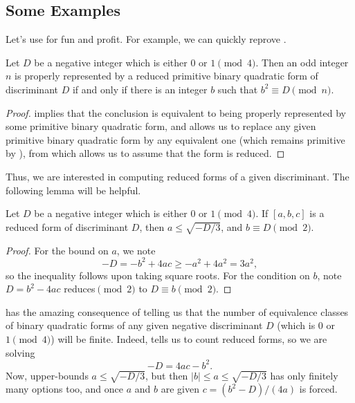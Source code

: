 \documentclass[../notes.tex]{subfiles}
\begin{document}
\subsection{Some Examples} \label{subsec:compute-primes-of-form}
Let's use  for fun and profit. For example, we can quickly reprove .
\begin{lemma} \label{lem:of-the-form-reduced}
	Let $D$ be a negative integer which is either $0$ or $1\pmod4$. Then an odd integer $n$ is properly represented by a reduced primitive binary quadratic form of discriminant $D$ if and only if there is an integer $b$ such that $b^2\equiv D\pmod n$.
\end{lemma}
\begin{proof}
	 implies that the conclusion is equivalent to being properly represented by some primitive binary quadratic form, and  allows us to replace any given primitive binary quad\-ratic form by any equivalent one (which remains primitive by ), from which  allows us to assume that the form is reduced.
\end{proof}
Thus, we are interested in computing reduced forms of a given discriminant. The following lemma will be helpful.
\begin{lemma} \label{lem:bounds-on-reduced-form}
	Let $D$ be a negative integer which is either $0$ or $1\pmod4$. If $[a,b,c]$ is a reduced form of discriminant $D$, then $a\le\sqrt{-D/3}$, and $b\equiv D\pmod2$.
\end{lemma}
\begin{proof}
	For the bound on $a$, we note
	\[-D=-b^2+4ac\ge-a^2+4a^2=3a^2,\]
	so the inequality follows upon taking square roots. For the condition on $b$, note $D=b^2-4ac$ reduces$\pmod2$ to $D\equiv b\pmod2$.
\end{proof}
\begin{remark}
	 has the amazing consequence of telling us that the number of equivalence classes of binary quadratic forms of any given negative discriminant $D$ (which is $0$ or $1\pmod4$) will be finite. Indeed,  tells us to count reduced forms, so we are solving
	\[-D=4ac-b^2.\]
	Now,  upper-bounds $a\le\sqrt{-D/3}$, but then $\left|b\right|\le a\le\sqrt{-D/3}$ has only finitely many options too, and once $a$ and $b$ are given $c=(b^2-D)/(4a)$ is forced.
\end{remark}
\end{document}

